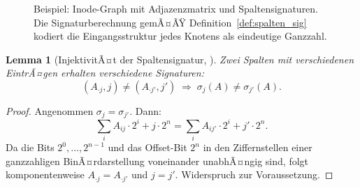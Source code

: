 ﻿\documentclass[a4paper,12pt]{article}
\theoremstyle{definition}
\theoremstyle{plain}
\newtheorem{lemma}{Lemma}[section]
\begin{document}
\begin{figure}[H]
\centering
{}
\caption{Beispiel: Inode-Graph mit Adjazenzmatrix und Spaltensignaturen.
Die Signaturberechnung gemÃ¤ÃŸ Definition~\ref{def:spalten_sig} kodiert
die Eingangsstruktur jedes Knotens als eindeutige Ganzzahl.}
\label{fig:beispiel_sig}
\end{figure}

\begin{lemma}[InjektivitÃ¤t der Spaltensignatur, \cite{dusgraph}]
\label{lem:inj}
  Zwei Spalten mit verschiedenen EintrÃ¤gen erhalten verschiedene
  Signaturen:
  \[
    (A_{\cdot j}, j) \neq (A_{\cdot j'}, j')
    \;\Longrightarrow\;
    \sigma_j(A) \neq \sigma_{j'}(A).
  \]
\end{lemma}

\begin{proof}
  Angenommen $\sigma_j = \sigma_{j'}$.  Dann:
  \[
    \sum_{i} A_{ij} \cdot 2^i + j \cdot 2^n
    = \sum_{i} A_{ij'} \cdot 2^i + j' \cdot 2^n.
  \]
  Da die Bits $2^0, \ldots, 2^{n-1}$ und das Offset-Bit $2^n$ in den
  Ziffernstellen einer ganzzahligen BinÃ¤rdarstellung voneinander unabhÃ¤ngig
  sind, folgt komponentenweise $A_{\cdot j} = A_{\cdot j'}$ und $j = j'$.
  Widerspruch zur Voraussetzung. 
\end{proof}
\end{document}

